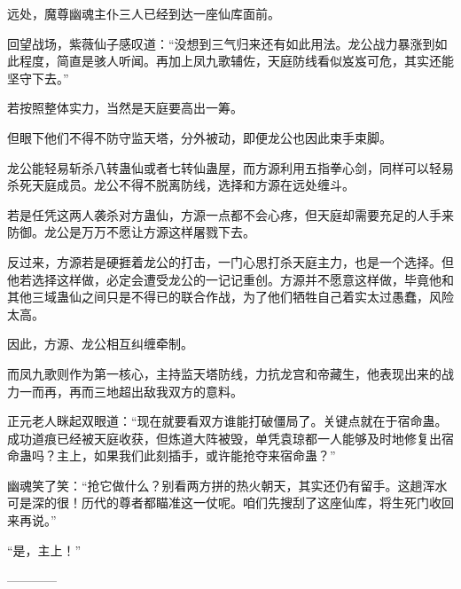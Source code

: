 \begin{this_body}
远处，魔尊幽魂主仆三人已经到达一座仙库面前。

回望战场，紫薇仙子感叹道：“没想到三气归来还有如此用法。龙公战力暴涨到如此程度，简直是骇人听闻。再加上凤九歌辅佐，天庭防线看似岌岌可危，其实还能坚守下去。”

若按照整体实力，当然是天庭要高出一筹。

但眼下他们不得不防守监天塔，分外被动，即便龙公也因此束手束脚。

龙公能轻易斩杀八转蛊仙或者七转仙蛊屋，而方源利用五指拳心剑，同样可以轻易杀死天庭成员。龙公不得不脱离防线，选择和方源在远处缠斗。

若是任凭这两人袭杀对方蛊仙，方源一点都不会心疼，但天庭却需要充足的人手来防御。龙公是万万不愿让方源这样屠戮下去。

反过来，方源若是硬捱着龙公的打击，一门心思打杀天庭主力，也是一个选择。但他若选择这样做，必定会遭受龙公的一记记重创。方源并不愿意这样做，毕竟他和其他三域蛊仙之间只是不得已的联合作战，为了他们牺牲自己着实太过愚蠢，风险太高。

因此，方源、龙公相互纠缠牵制。

而凤九歌则作为第一核心，主持监天塔防线，力抗龙宫和帝藏生，他表现出来的战力一而再，再而三地超出敌我双方的意料。

正元老人眯起双眼道：“现在就要看双方谁能打破僵局了。关键点就在于宿命蛊。成功道痕已经被天庭收获，但炼道大阵被毁，单凭袁琼都一人能够及时地修复出宿命蛊吗？主上，如果我们此刻插手，或许能抢夺来宿命蛊？”

幽魂笑了笑：“抢它做什么？别看两方拼的热火朝天，其实还仍有留手。这趟浑水可是深的很！历代的尊者都瞄准这一仗呢。咱们先搜刮了这座仙库，将生死门收回来再说。”

“是，主上！”

------------

\end{this_body}


